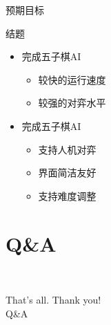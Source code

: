 \documentclass[compress]{beamer}
\begin{document}
\begin{frame}{预期目标}
  \begin{block}{结题}
    \begin{itemize}
      \setlength{\itemsep}{6pt}
      \item 完成五子棋AI
            \begin{itemize}
              \setlength{\itemsep}{6pt}
              \item 较快的运行速度
              \item 较强的对弈水平
              
            \end{itemize}
      \item 完成五子棋AI
            \begin{itemize}
            \setlength{\itemsep}{6pt}
            \item 支持人机对弈
            \item 界面简洁友好
            \item 支持难度调整
            \end{itemize}
            
    \end{itemize}
  \end{block}
\end{frame}

\section{Q\&A}

\begin{frame}{\secname~ }
  \begin{center}
    \huge{That's all. Thank you!}\\
    \vspace{1cm}
    \huge{Q\&A}
  \end{center}
\end{frame}
\end{document}
